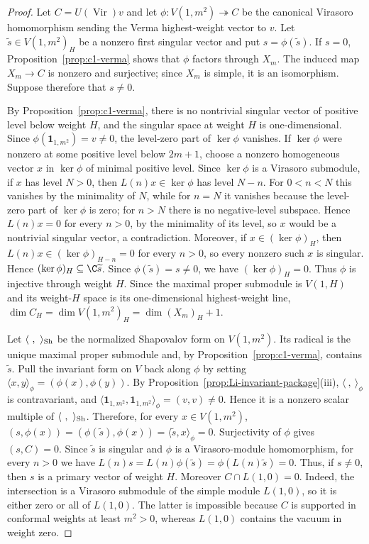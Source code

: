 \documentclass[12pt,leqno]{amsart}
\numberwithin{equation}{section} \newtheorem{thm}{Theorem}[section] \newtheorem{lem}[thm]{Lemma} \newtheorem{ex}[thm]{Example} \newtheorem{prop}[thm]{Proposition} \newtheorem{cor}[thm]{Corollary} \newtheorem{defi}[thm]{Definition} \newtheorem{rmk}[thm]{Remark} \newtheorem{notation}[thm]{Notation}
\newcommand{\one}{\mathbf{1}}
\newcommand{\Vir}{\operatorname{Vir}}
\begin{document}
\begin{proof}
Let $C=U(\Vir)v$ and let \(\phi:V(1,m^2)\twoheadrightarrow C\) be the canonical Virasoro homomorphism sending the Verma highest-weight vector to $v$. Let $\widetilde s\in V(1,m^2)_H$ be a nonzero first singular vector and put $s=\phi(\widetilde s)$. If $s=0$, Proposition~\ref{prop:c1-verma} shows that $\phi$ factors through $X_m$. The induced map $X_m\to C$ is nonzero and surjective; since $X_m$ is simple, it is an isomorphism. Suppose therefore that $s\ne0$.

By Proposition~\ref{prop:c1-verma}, there is no nontrivial singular vector of positive level below weight $H$, and the singular space at weight $H$ is one-dimensional. Since $\phi(\one_{1,m^2})=v\ne0$, the level-zero part of $\ker\phi$ vanishes. If $\ker\phi$ were nonzero at some positive level below $2m+1$, choose a nonzero homogeneous vector $x$ in $\ker\phi$ of minimal positive level. Since $\ker\phi$ is a Virasoro submodule, if $x$ has level $N>0$, then $L(n)x\in\ker\phi$ has level $N-n$. For $0<n<N$ this vanishes by the minimality of $N$, while for $n=N$ it vanishes because the level-zero part of $\ker\phi$ is zero; for $n>N$ there is no negative-level subspace. Hence $L(n)x=0$ for every $n>0$, by the minimality of its level, so $x$ would be a nontrivial singular vector, a contradiction. Moreover, if $x\in(\ker\phi)_H$, then $L(n)x\in(\ker\phi)_{H-n}=0$ for every $n>0$, so every nonzero such $x$ is singular. Hence \((\ker\phi)_H\subseteq\C\widetilde s\). Since $\phi(\widetilde s)=s\ne0$, we have $(\ker\phi)_H=0$. Thus $\phi$ is injective through weight $H$. Since the maximal proper submodule is $V(1,H)$ and its weight-$H$ space is its one-dimensional highest-weight line, \(\dim C_H=\dim V(1,m^2)_H=\dim(X_m)_H+1.\)

Let $\langle\ ,\ \rangle_{\rm Sh}$ be the normalized Shapovalov form on $V(1,m^2)$. Its radical is the unique maximal proper submodule and, by Proposition~\ref{prop:c1-verma}, contains $\widetilde s$. Pull the invariant form on $V$ back along $\phi$ by setting \(\langle x,y\rangle_\phi=(\phi(x),\phi(y)).\) By Proposition~\ref{prop:Li-invariant-package}(iii), $\langle\ ,\ \rangle_\phi$ is contravariant, and \(\langle\one_{1,m^2},\one_{1,m^2}\rangle_\phi=(v,v)\ne0.\) Hence it is a nonzero scalar multiple of $\langle\ ,\ \rangle_{\rm Sh}$. Therefore, for every $x\in V(1,m^2)$, \((s,\phi(x))=(\phi(\widetilde s),\phi(x))=\langle\widetilde s,x\rangle_\phi=0.\) Surjectivity of $\phi$ gives $(s,C)=0$. Since $\widetilde s$ is singular and $\phi$ is a Virasoro-module homomorphism, for every $n>0$ we have $ L(n)s=L(n)\phi(\widetilde s) =\phi(L(n)\widetilde s)=0. $ Thus, if $s\ne0$, then $s$ is a primary vector of weight $H$. Moreover $C\cap L(1,0)=0$. Indeed, the intersection is a Virasoro submodule of the simple module $L(1,0)$, so it is either zero or all of $L(1,0)$. The latter is impossible because $C$ is supported in conformal weights at least $m^2>0$, whereas $L(1,0)$ contains the vacuum in weight zero.


\end{proof}
\end{document}
